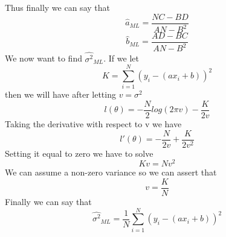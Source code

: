 \documentclass[11pt,psfig]{article}
\begin{document}
Thus finally we can say that
\[
\hat{a}_{ML} = \frac{NC-BD}{AN-B^2}
\]
\[
\hat{b}_{ML} = \frac{AD-BC}{AN-B^2}
\]
We now want to find $\hat{\sigma^2}_{ML}$. If we let
\[
K = \sum_{i=1}^N{(y_i - (ax_i + b))^2}
\]
then we will have after letting $v = \sigma^2$
\[
l(\theta) = -\frac{N}{2} log(2\pi v) - \frac{K}{2v}
\]
Taking the derivative with respect to v we have
\[
l'(\theta) = -\frac{N}{2v} + \frac{K}{2v^2}
\]
Setting it equal to zero we have to solve
\[
Kv = N v^2
\]
We can assume a non-zero variance so we can assert that
\[
v = \frac{K}{N}
\]
Finally we can say that
\[
\hat{\sigma^2}_{ML} = \frac{1}{N} \sum_{i=1}^N{(y_i - (ax_i + b))^2}
\]
\end{document}
